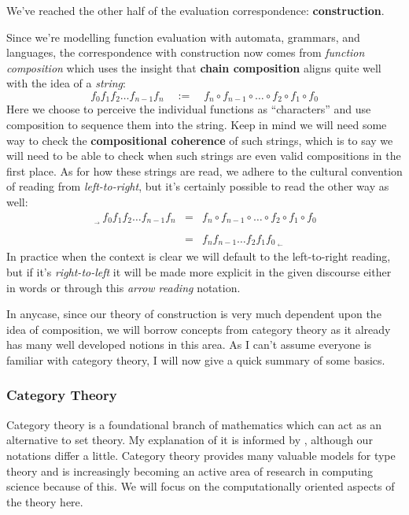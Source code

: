 \documentclass[twoside]{article}
\newcommand{\qdefeq}{\ensuremath{\quad :=\quad}}
\newcommand{\strong}[1]{{\bfseries #1}}
\newcommand{\readleft}{\ensuremath{\,_{_\leftarrow}\,}}
\newcommand{\readright}{\ensuremath{\,_{_\rightarrow}\,}}
\begin{document}
We've reached the other half of the evaluation correspondence: \strong{construction}.

Since we're modelling function evaluation with automata, grammars, and languages, the correspondence with construction
now comes from \emph{function composition} which uses the insight that \strong{chain composition} aligns quite well with
the idea of a \emph{string}:
$$ f_0f_1f_2\ldots f_{n-1}f_n \qdefeq f_n \circ f_{n-1} \circ \ldots \circ f_2 \circ f_1\circ f_0 $$
Here we choose to perceive the individual functions as ``characters'' and use composition to sequence them into the string.
Keep in mind we will need some way to check the \strong{compositional coherence} of such strings, which is to say we will
need to be able to check when such strings are even valid compositions in the first place. As for how these strings are
read, we adhere to the cultural convention of reading from \emph{left-to-right}, but it's certainly possible to read
the other way as well:
$$ \begin{array}{rcl}
\readright f_0f_1f_2\ldots f_{n-1}f_n		& = & f_n \circ f_{n-1} \circ \ldots \circ f_2 \circ f_1\circ f_0	\\
															\\
						& = & f_nf_{n-1}\ldots f_2f_1f_0 \readleft 
\end{array} $$
In practice when the context is clear we will default to the left-to-right reading, but if it's \emph{right-to-left}
it will be made more explicit in the given discourse either in words or through this \emph{arrow reading} notation.

In anycase, since our theory of construction is very much dependent upon the idea of composition, we will borrow concepts
from category theory as it already has many well developed notions in this area. As I can't assume everyone is familiar
with category theory, I will now give a quick summary of some basics.

\subsubsection*{Category Theory}

Category theory is a foundational branch of mathematics which can act as an alternative to set theory. My explanation of
it is informed by \cite{ctic}, although our notations differ a little. Category theory provides many valuable models for
type theory and is increasingly becoming an active area of research in computing science because of this. We will focus
on the computationally oriented aspects of the theory here.
\end{document}
